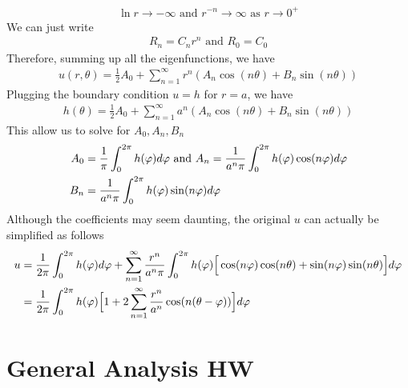 \documentclass{report}
\begin{document}
\begin{mdframed}
 \begin{align*}
\ln r\to -\infty \text{ and }r^{-n}\to \infty \text{ as }r\to 0^+
\end{align*}
We can just write 
\begin{align*}
R_n=C_nr^n \text{ and }R_0=C_0
\end{align*}
Therefore, summing up all the eigenfunctions, we have  
\begin{align*}
u(r,\theta)= \frac{1}{2}A_0 + \sum_{n=1}^{\infty} r^n (A_n \cos (n \theta)+ B_n \sin (n\theta))
\end{align*}
Plugging the boundary condition $u=h$ for  $r=a$, we have 
 \begin{align*}
h(\theta) = \frac{1}{2}A_0 + \sum_{n=1}^{\infty} a^n (A_n \cos (n \theta)+ B_n \sin (n \theta))
\end{align*}
This allow us to solve for $A_0,A_n,B_n$
\begin{align*}
A_0&= \frac{1}{\pi }\int_0^{2\pi } h(\pfi)d \pfi \text{ and } A_n= \frac{1}{a^n \pi }\int_0^{2\pi }h(\pfi) \cos (n \pfi)d \pfi  \\
B_n&= \frac{1}{a^n \pi}\int_{0}^{2\pi } h(\pfi)\sin (n \pfi)d\phi
\end{align*}
Although the coefficients may seem daunting, the original $u$ can actually be simplified as follows 
\begin{align*}
u&= \frac{1}{2\pi }\int_0^{2\pi }h(\pfi)d\phi + \sum_{n=1}^{\infty} \frac{r^n}{a^n \pi }\int_0^{2\pi } h(\pfi) \Big[\cos (n \pfi)\cos (n \theta)+ \sin (n \pfi)\sin (n \theta) \Big] d\pfi  \\
&=\frac{1}{2\pi } \int_0^{2\pi }h(\phi)\Big[1+ 2\sum_{n=1}^{\infty} \frac{r^n}{a^n}\cos (n(\theta- \pfi)) \Big]d \pfi
\end{align*}
\end{mdframed}
\chapter{General Analysis HW}
\end{document}
